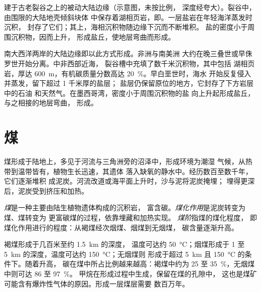 \begin{omfigure}
{\small 建于古老裂谷之上的被动大陆边缘（示意图，未按比例，
深度经夸大）。裂谷中，由围限的大陆地壳倾斜块体
中保存着湖相页岩，即。一层盐岩在年轻海洋蒸发时沉积，
封存了它们；其上，海相沉积物随边缘下沉而不断堆积。
盐的密度小于周围沉积物，因而上升，
形成盐丘，使地层弯曲而形成。}
\end{omfigure}

南大西洋两岸的大陆边缘即以此方式形成。非洲与南美洲
大约在晚三叠世或早侏罗世开始分离。中非西部近海，
裂谷槽中充填了数千米沉积物，其中包括
湖相页岩，厚达 \qty{600}{m}，有机碳质量分数高达
\qty{20}{\percent}。早白垩世时，海水
开始反复侵入并蒸发，留下超过 1 千米厚的盐层；
盐层仍保留原位的地方，它封存了下方岩层中的石油
和天然气。在墨西哥湾，密度小于周围沉积物的盐
向上升起形成盐丘，与之相接的地层弯曲，
形成。

\section{煤}

煤形成于陆地上，多见于河流与三角洲旁的沼泽中，形成环境为潮湿
气候，从热带到温带皆有，植物生长迅速，其遗体
落入缺氧的静水中。经历数百至数千年，它们逐渐堆积
成泥炭。河流改道或海平面上升时，沙与泥将泥炭掩埋；
埋得更深后，泥炭受到挤压和加热。

\begin{definition}[煤；煤化作用；煤阶]\label{def:g11:fossil-fuel-geology:coal}
\emph{煤}是一种主要由陆生植物遗体构成的沉积岩，
富含碳。\emph{煤化作用}是泥炭转变为煤、煤转变为
更富碳煤的过程，依靠埋藏和加热实现。
\emph{煤阶}指煤的煤化程度，
即煤化作用进行的程度：从褐煤经次烟煤、烟煤到无烟煤，
碳含量逐渐升高。
\end{definition}

褐煤形成于几百米至约 \qty{1.5}{km} 的深度，
温度可达约 \qty{50}{\degreeCelsius}；烟煤形成于 1 至
\qty{5}{km} 的深度，温度可达约 \qty{150}{\degreeCelsius}；无烟煤则
形成于超过 \qty{5}{km} 且 \qty{150}{\degreeCelsius} 的条件下。随着升高，
碳在煤中所占比例越来越高：褐煤中约为
25 至 \qty{35}{\percent}，无烟煤中则可达 86 至 \qty{97}{\percent}。
甲烷在形成过程中生成，保留在煤的孔隙中，
这也是煤矿可能含有爆炸性气体的原因。形成一层煤层需要
数百万年。

